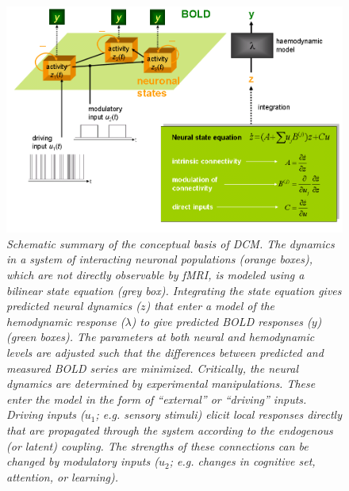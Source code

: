 \begin{figure}[ht]
\begin{center}
\includegraphics[width=130mm]{dcm/Fig2}
\caption{\em Schematic summary of the conceptual basis of DCM.  The dynamics in a system of interacting neuronal populations (orange boxes), which are not directly observable by fMRI, is modeled using a bilinear state equation (grey box).  Integrating the state equation gives predicted neural dynamics ($z$) that enter a model of the hemodynamic response ($\lambda$) to give predicted BOLD responses ($y$) (green boxes).  The parameters at both neural and hemodynamic levels are adjusted such that the differences between predicted and measured BOLD series are minimized.  Critically, the neural dynamics are determined by experimental manipulations.  These enter the model in the form of ``external'' or ``driving'' inputs.  Driving inputs ($u_1$; e.g. sensory stimuli) elicit local responses directly that are propagated through the system according to the endogenous (or latent) coupling.  The strengths of these connections can be changed by modulatory inputs ($u_2$; e.g. changes in cognitive set, attention, or learning).\label{dcm_fig2}}
\end{center}
\end{figure}

